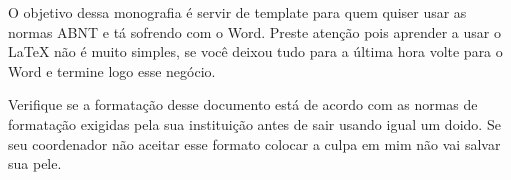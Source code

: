 \begin{resumo}

O objetivo dessa monografia é servir de template para quem quiser usar as normas ABNT e tá sofrendo com o Word. Preste atenção pois aprender a usar o LaTeX não é muito simples, se você deixou tudo para a última hora volte para o Word e termine logo esse negócio.

Verifique se a formatação desse documento está de acordo com as normas de formatação exigidas pela sua instituição antes de sair usando igual um doido. Se seu coordenador não aceitar esse formato colocar a culpa em mim não vai salvar sua pele.


\end{resumo}